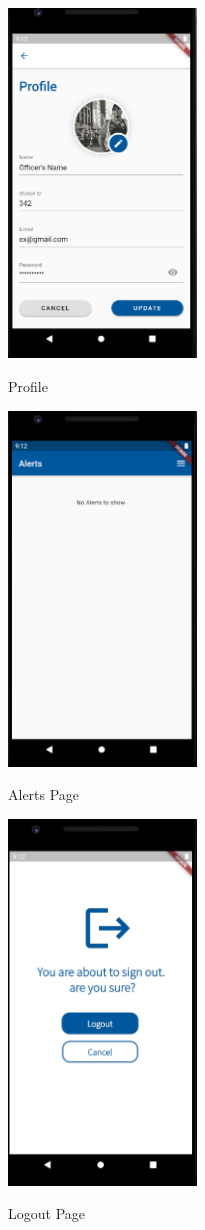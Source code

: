 \documentclass[12pt]{article}
\begin{document}
\begin{figure}[h]
  \centering
  \includegraphics[width=5cm]{profile.PNG}
  \label{fig:2}
   \caption{Profile}
\end{figure}
\FloatBarrier
\begin{figure}[h]
  \centering
  \includegraphics[width=5cm]{Alerts.PNG}
  \label{fig:2}
   \caption{Alerts Page}
\end{figure}
\FloatBarrier
\begin{figure}[h]
  \centering
  \includegraphics[width=5cm]{Logout.PNG}
  \label{fig:2}
   \caption{Logout Page}
\end{figure}
\end{document}
